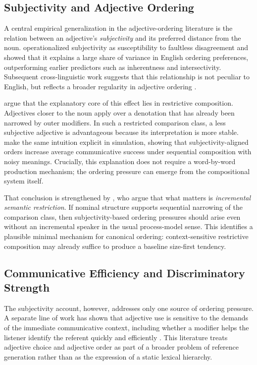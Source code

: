 \documentclass[man,floatsintext]{apa7}
\begin{document}
\subsection{Subjectivity and Adjective Ordering}
\label{sec:bg:subjectivity}

A central empirical generalization in the adjective-ordering literature is the relation between an adjective's \emph{subjectivity} and its preferred distance from the noun.
\citet{scontras2017subjectivity} operationalized subjectivity as susceptibility to faultless disagreement and showed that it explains a large share of variance in English ordering preferences, outperforming earlier predictors such as inherentness and intersectivity.
Subsequent cross-linguistic work suggests that this relationship is not peculiar to English, but reflects a broader regularity in adjective ordering \citep{trainin2021s,scontras2023adjective}.

\citet{scontras2019grammatical} argue that the explanatory core of this effect lies in restrictive composition.
Adjectives closer to the noun apply over a denotation that has already been narrowed by outer modifiers.
In such a restricted comparison class, a less subjective adjective is advantageous because its interpretation is more stable.
\citet{franke2019subjectivity} make the same intuition explicit in simulation, showing that subjectivity-aligned orders increase average communicative success under sequential composition with noisy meanings.
Crucially, this explanation does not require a word-by-word production mechanism; the ordering pressure can emerge from the compositional system itself.

That conclusion is strengthened by \citet{scontras2020incremental}, who argue that what matters is \emph{incremental semantic restriction}.
If nominal structure supports sequential narrowing of the comparison class, then subjectivity-based ordering pressures should arise even without an incremental speaker in the usual process-model sense.
This identifies a plausible minimal mechanism for canonical ordering: context-sensitive restrictive composition may already suffice to produce a baseline size-first tendency.

\subsection{Communicative Efficiency and Discriminatory Strength}
\label{sec:bg:efficiency}

The subjectivity account, however, addresses only one source of ordering pressure.
A separate line of work has shown that adjective use is sensitive to the demands of the immediate communicative context, including whether a modifier helps the listener identify the referent quickly and efficiently \citep{rubio2016redundant,rubio2019overinformative,degen2020redundancy}.
This literature treats adjective choice and adjective order as part of a broader problem of reference generation rather than as the expression of a static lexical hierarchy.
\end{document}
